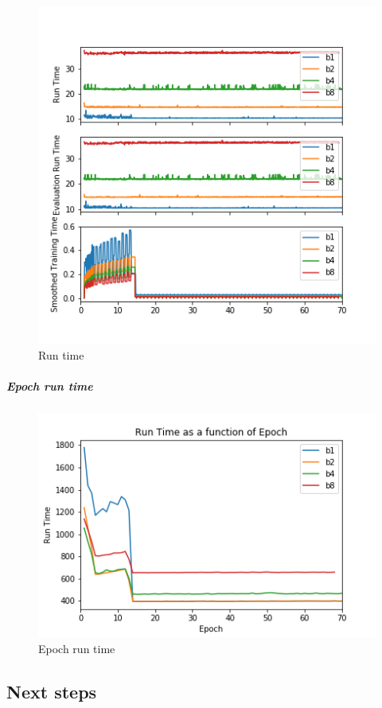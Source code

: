 \begin{figure}
\centering
\includegraphics{b1a8_time.png}
\caption{Run time}
\end{figure}

\subparagraph{Epoch run time}\label{epoch-run-time-1}

\begin{figure}
\centering
\includegraphics{b1a8_epoch.png}
\caption{Epoch run time}
\end{figure}

\subsection{Next steps}\label{next-steps}

